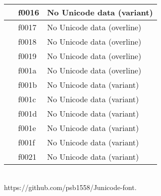 \documentclass[12pt,letterpaper,openany]{book}
\begin{document}
\begin{center}
\begin{supertabular}{|m{0.25in}|m{0.5in}|m{4in}|}
			󰀖 & f0016 & No Unicode data (variant)\\\hline
			󰀗 & f0017 & No Unicode data (overline)\\\hline
			󰀘 & f0018 & No Unicode data (overline)\\\hline
			󰀙 & f0019 & No Unicode data (overline)\\\hline
			󰀚 & f001a & No Unicode data (overline)\\\hline
			󰀛 & f001b & No Unicode data (variant)\\\hline
			󰀜 & f001c & No Unicode data (variant)\\\hline
			󰀝 & f001d & No Unicode data (variant)\\\hline
			󰀞 & f001e & No Unicode data (variant)\\\hline
			󰀟 & f001f & No Unicode data (variant)\\\hline
			󰀡 & f0021 & No Unicode data (variant)\\\hline
		\end{supertabular}
	\end{center}
	
	\vspace*{\fill}
	\begin{center}
		{}\\
		{\color{myRed}https://github.com/psb1558/Junicode-font.}
	\end{center}
\end{document}
